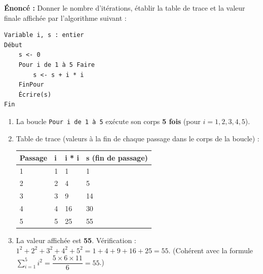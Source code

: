 \documentclass[11pt]{article}
\begin{document}
\begin{corrige}
\textbf{Énoncé :} Donner le nombre d'itérations, établir la table de trace et la valeur finale affichée par l'algorithme suivant :
\begin{lstlisting}
Variable i, s : entier
Début
    s <- 0
    Pour i de 1 à 5 Faire
        s <- s + i * i
    FinPour
    Écrire(s)
Fin
\end{lstlisting}
\tcblower
\begin{enumerate}
  \item La boucle \texttt{Pour i de 1 à 5} exécute son corps \textbf{5 fois} (pour $i = 1, 2, 3, 4, 5$).
  \item Table de trace (valeurs à la fin de chaque passage dans le corps de la boucle) :

\begin{center}
\begin{tabularx}{\linewidth}{|l|X|X|X|}
\hline
\rowcolor{popblueL} \textbf{Passage} & \textbf{i} & \textbf{i * i} & \textbf{s (fin de passage)} \\
\hline
1 & 1 & 1 & 1 \\
\hline
2 & 2 & 4 & 5 \\
\hline
3 & 3 & 9 & 14 \\
\hline
4 & 4 & 16 & 30 \\
\hline
5 & 5 & 25 & 55 \\
\hline
\end{tabularx}
\end{center}

  \item La valeur affichée est \textbf{55}. Vérification : $1^2 + 2^2 + 3^2 + 4^2 + 5^2 = 1 + 4 + 9 + 16 + 25 = 55$. (Cohérent avec la formule $\sum_{i=1}^{5} i^2 = \dfrac{5 \times 6 \times 11}{6} = 55$.)
\end{enumerate}
\end{corrige}
\end{document}
